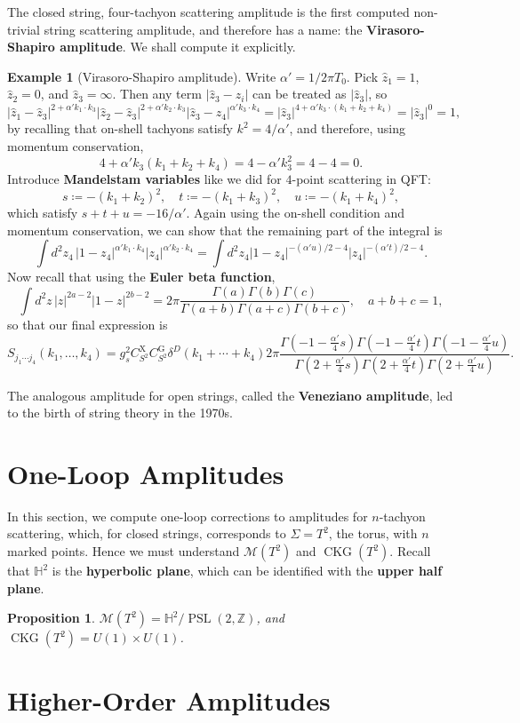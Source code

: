 \documentclass{report}
\theoremstyle{plain}
\newtheorem{proposition}[theorem]{Proposition}
\theoremstyle{definition}
\newtheorem{example}[theorem]{Example}
\theoremstyle{remark}
\newcommand{\bZ}{\mathbb{Z}}
\newcommand{\bH}{\mathbb{H}}
\newcommand{\cM}{\mathcal{M}}
\DeclareMathOperator{\PSL}{PSL}
\DeclareMathOperator{\CKG}{CKG}
\begin{document}
The closed string, four-tachyon scattering amplitude is the first
computed non-trivial string scattering amplitude, and therefore has a
name: the {\bf Virasoro-Shapiro amplitude}. We shall compute it
explicitly.

\begin{example}[Virasoro-Shapiro amplitude]
  Write $\alpha' = 1/2\pi T_0$. Pick $\hat{z}_1 = 1$, $\hat{z}_2 = 0$,
  and $\hat{z}_3 = \infty$. Then any term $|\hat{z}_3 - z_i|$ can be
  treated as $|\hat{z}_3|$, so
  \[ |\hat{z}_1 - \hat{z}_3|^{2+\alpha' k_1\cdot k_3}|\hat{z}_2 - \hat{z}_3|^{2+\alpha' k_2 \cdot k_3}|\hat{z}_3 - z_4|^{\alpha' k_3 \cdot k_4} = |\hat{z}_3|^{4 + \alpha' k_3 \cdot (k_1 + k_2 + k_4)} = |\hat{z}_3|^0 = 1, \]
  by recalling that on-shell tachyons satisfy $k^2 = 4/\alpha'$, and
  therefore, using momentum conservation,
  \[ 4 + \alpha' k_3(k_1 + k_2 + k_4) = 4 - \alpha' k_3^2 = 4 - 4 = 0. \]
  Introduce {\bf Mandelstam variables} like we did for $4$-point
  scattering in QFT:
  \[ s \coloneqq -(k_1 + k_2)^2, \quad t \coloneqq -(k_1 + k_3)^2, \quad u \coloneqq -(k_1 + k_4)^2, \]
  which satisfy $s + t + u = -16/\alpha'$. Again using the on-shell
  condition and momentum conservation, we can show that the remaining
  part of the integral is
  \[ \int d^2z_4 \, |1 - z_4|^{\alpha' k_1 \cdot k_4} |z_4|^{\alpha' k_2 \cdot k_4} = \int d^2z_4 |1 - z_4|^{-(\alpha' u)/2 - 4} |z_4|^{-(\alpha' t)/2 - 4}. \]
  Now recall that using the {\bf Euler beta function},
  \[ \int d^2z \, |z|^{2a-2} |1-z|^{2b-2} = 2\pi \frac{\Gamma(a) \Gamma(b) \Gamma(c)}{\Gamma(a+b) \Gamma(a+c) \Gamma(b+c)}, \quad a + b + c = 1, \]
  so that our final expression is
  \[ S_{j_1 \cdots j_4}(k_1, \ldots, k_4) = g_s^2 C_{S^2}^{\text{X}} C_{S^2}^{\text{G}} \delta^D(k_1 + \cdots + k_4) 2\pi \frac{\Gamma(-1 - \frac{\alpha'}{4} s)\Gamma(-1 - \frac{\alpha'}{4} t)\Gamma(-1 - \frac{\alpha'}{4} u)}{\Gamma(2 + \frac{\alpha'}{4}s)\Gamma(2 + \frac{\alpha'}{4}t)\Gamma(2 + \frac{\alpha'}{4}u)}. \]
\end{example}

The analogous amplitude for open strings, called the {\bf Veneziano
  amplitude}, led to the birth of string theory in the 1970s.

\section{One-Loop Amplitudes}

In this section, we compute one-loop corrections to amplitudes for
$n$-tachyon scattering, which, for closed strings, corresponds to
$\Sigma = T^2$, the torus, with $n$ marked points. Hence we must
understand $\cM(T^2)$ and $\CKG(T^2)$. Recall that $\bH^2$ is the {\bf
  hyperbolic plane}, which can be identified with the {\bf upper half
  plane}.

\begin{proposition}
  $\cM(T^2) = \bH^2/\PSL(2, \bZ)$, and $\CKG(T^2) = U(1) \times U(1)$.
\end{proposition}

\section{Higher-Order Amplitudes}
\end{document}
